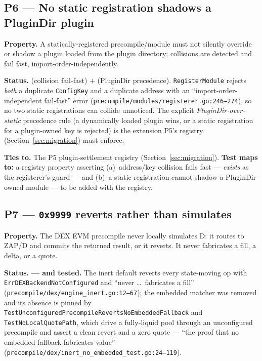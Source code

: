\subsection*{P6 --- No static registration shadows a PluginDir plugin}

\textbf{Property.} A statically-registered precompile/module must not
silently override or shadow a plugin loaded from the plugin directory;
collisions are detected and fail fast, import-order-independently.

\textbf{Status.} \IMPL{} (collision fail-fast) $+$ \DESIGN{}
(PluginDir precedence). \texttt{RegisterModule} rejects \emph{both} a
duplicate \texttt{ConfigKey} and a duplicate address with an
``import-order-independent fail-fast'' error
(\texttt{precompile/modules/registerer.go:246--274}), so no two static
registrations can collide unnoticed. The explicit
\emph{PluginDir-over-static} precedence rule (a dynamically loaded
plugin wins, or a static registration for a plugin-owned key is
rejected) is the \DESIGN{} extension P5's registry
(Section~\ref{sec:migration}) must enforce.

\textbf{Ties to.} The P5 plugin-settlement registry
(Section~\ref{sec:migration}). \textbf{Test maps to:} a registry
property asserting (a)~address/key collision fails fast --- \emph{exists}
as the registerer's guard --- and (b)~a static registration cannot
shadow a PluginDir-owned module --- to be added with the registry.

\subsection*{P7 --- \texttt{0x9999} reverts rather than simulates}

\textbf{Property.} The DEX EVM precompile never locally simulates D: it
routes to ZAP/D and commits the returned result, or it reverts. It never
fabricates a fill, a delta, or a quote.

\textbf{Status.} \IMPL{} \textbf{--- and tested.} The inert default
reverts every state-moving op with \texttt{ErrDEXBackendNotConfigured}
and ``never \ldots\ fabricates a fill''
(\texttt{precompile/dex/engine\_inert.go:12--67}); the embedded matcher
was removed and its absence is pinned by
\texttt{TestUnconfiguredPrecompileRevertsNoEmbeddedFallback} and
\texttt{TestNoLocalQuotePath}, which drive a fully-liquid pool through an
unconfigured precompile and assert a clean revert and a zero quote ---
``the proof that no embedded fallback fabricates value''
(\texttt{precompile/dex/inert\_no\_embedded\_test.go:24--119}).

